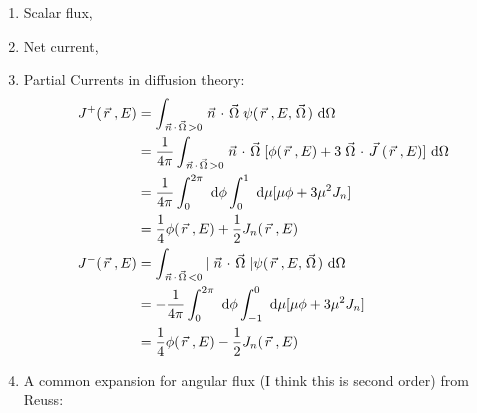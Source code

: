 \documentclass{school-22.211-notes}
\begin{document}
\clearpage
{}
\begin{enumerate}
\item Scalar flux, 
\item Net current,
\item Partial Currents in diffusion theory:
  \begin{align}
    J^+(\vecr, E) &= \int_{\vecn \cdot \vecOmega > 0} \vecn \cdot \vecOmega \psi(\vecr, E, \vecOmega) \dOmega \\
    &= \frac{1}{4\pi} \int_{\vecn \cdot \vecOmega > 0} \vecn \cdot \vecOmega [\phi(\vecr, E) + 3 \vecOmega \cdot \vecJ(\vecr, E) ] \dOmega \\
    &= \frac{1}{4\pi} \int_0^{2\pi} \dphi \int_0^1 \dmu [ \mu \phi + 3 \mu^2 J_n] \\
    &= \frac{1}{4} \phi(\vecr, E) + \frac{1}{2} J_n (\vecr, E) \\
    J^-(\vecr, E) &= \int_{\vecn \cdot \vecOmega < 0} |\vecn \cdot \vecOmega| \psi(\vecr, E, \vecOmega) \dOmega  \\
    &= -\frac{1}{4\pi} \int_0^{2\pi} \dphi \int_{-1}^0 \dmu [ \mu \phi + 3 \mu^2 J_n] \\
    &= \frac{1}{4} \phi(\vecr, E) - \frac{1}{2} J_n (\vecr, E) 
  \end{align}

\item A common expansion for angular flux (I think this is second order) from Reuss: 
\eqn{    \int_{4\pi} \psi \dOmega &= \phi }
\end{enumerate}
\end{document}

